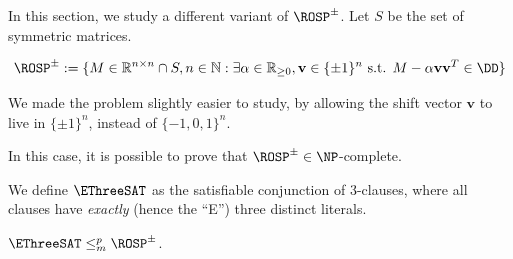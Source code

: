 In this section, we study a different variant of $\ROSP^\pm$. Let $S$ be the set of symmetric matrices.

\begin{definition}[$\ROSP^\pm$]
	\begin{equation}
		\ROSP^\pm := \{M\in\mathbb{R}^{n\times n}\cap S, n\in\mathbb{N}: \exists \alpha\in\mathbb{R}_{\geq 0}, \mathbf{v}\in\{\pm 1\}^n \text{ s.t. } M-\alpha \mathbf{vv}^T \in \DD\}
	\end{equation}
\end{definition}

We made the problem slightly easier to study, by allowing the shift vector $\mathbf{v}$ to live in $\{\pm 1\}^n$, instead of $\{-1, 0, 1\}^n$.

In this case, it is possible to prove that $\ROSP^{\pm}\in\NP$-complete.

We define $\EThreeSAT$ as the satisfiable conjunction of 3-clauses, where all clauses have \emph{exactly} (hence the ``E'') three distinct literals. 

\begin{theorem}
	\label{thm:rosp_pm_one_npc}
	$\EThreeSAT \leq^p_m \ROSP^{\pm}$.
\end{theorem}

